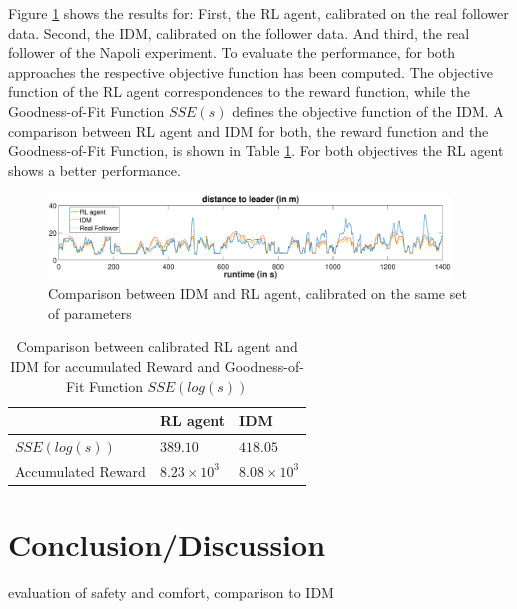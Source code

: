 \documentclass[review]{elsarticle}
\providecommand{\3}{{\ss}}
\begin{document}
Figure \ref{fig:IDMvsRL} shows the results for: First, the RL agent, calibrated on the real follower data. Second, the IDM, calibrated on the follower data. And third, the real follower of the Napoli experiment. To evaluate the performance, for both approaches the respective objective function has been computed. The objective function of the RL agent correspondences to the reward function, while the Goodness-of-Fit Function $SSE(s)$ defines the objective function of the IDM. A comparison between RL agent and IDM for both, the reward function and the Goodness-of-Fit Function, is shown in Table \ref{tab:objectiveFunc}. For both objectives the RL agent shows a better performance.

\begin{figure}
	
	\centering
	\includegraphics[width=0.95\textwidth]{images/IDMvsRL_dist}
	\caption{Comparison between IDM and RL agent, calibrated on the same set of parameters}
	\label{fig:IDMvsRL}
\end{figure}

\begin{table}
	\caption{Comparison between calibrated RL agent and IDM for accumulated Reward and Goodness-of-Fit Function $SSE(log(s))$} 
	\label{tab:objectiveFunc} 
	\begin{center}
		\begin{tabular}{p{} | p{} p{}  } 
			& RL agent & IDM   \\ \hline
			$SSE(log(s))$ & $389.10$ &  $418.05$	\\
			Accumulated Reward &  $8.23 \times 10^3$   & $8.08\times 10^3$
			
		\end{tabular}
	\end{center}
\end{table}


\section{Conclusion/Discussion}
evaluation of safety and comfort, comparison to IDM




\end{document}
